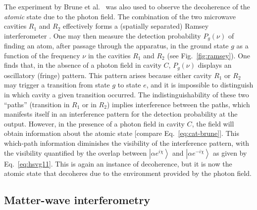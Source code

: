 \documentclass[3p,sort&compress]{elsarticle}
\newcommand{\ket}[1]{\left\vert{#1}\right\rangle}
\newcommand{\E}{\ensuremath{e}}
\newcommand{\I}{\ensuremath{i}}
\begin{document}
The experiment by Brune et al.\ \cite{Brune:1996:om} was also used to observe the decoherence of the \emph{atomic} state due to the photon field. The combination of the two microwave cavities $R_1$ and $R_2$ effectively forms a (spatially separated) Ramsey interferometer \cite{Ramsey:1950:pp,Haroche:2006:hh}. One may then measure the detection probability $P_g(\nu)$ of finding an atom, after passage through the apparatus, in the ground state $g$ as a function of the frequency $\nu$ in the cavities $R_1$ and $R_2$ (see Fig.~\ref{fig:ramsey}). One finds that, in the absence of a photon field in cavity $C$, $P_g(\nu)$ displays an oscillatory (fringe) pattern. This pattern arises because either cavity $R_1$ or $R_2$ may trigger a transition from state $g$ to state $e$, and it is impossible to distinguish in which cavity a given transition occurred. The indistinguishability of these two ``paths'' (transition in $R_1$ or in $R_2$) implies interference between the paths, which manifests itself in an interference pattern for the detection probability at the output. However, in the presence of a photon field in cavity $C$, the field will obtain information about the atomic state [compare Eq.~\eqref{eq:cat-brune}]. This which-path information diminishes the visibility of the interference pattern, with the visibility quantified by the overlap between $\ket{\alpha \E^{\I \chi}}$ and $\ket{\alpha \E^{-\I \chi}}$ as given by Eq.~\eqref{eq:hsvg11}. This is again an instance of decoherence, but it is now the atomic state that decoheres due to the environment provided by the photon field. 


\subsection{\label{sec:matt-wave-interf}Matter-wave interferometry}
\end{document}
